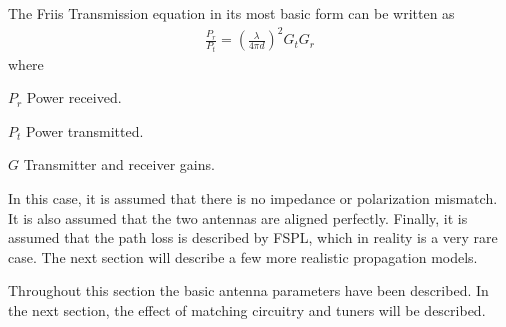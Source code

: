 The Friis Transmission equation in its most basic form can be written as \cite{balanis2012antenna} 
\begin{align}%
    \frac{P_r}{P_t} = \left( \frac{\lambda}{4 \pi d} \right)^2 G_{t} G_{r} 
\end{align}
where
\begin{where} 
\item[$P_r$] Power received.
\item[$P_t$] Power transmitted.
\item[$G$] Transmitter and receiver gains.
\end{where}
In this case, it is assumed that there is no impedance or polarization mismatch. It is also assumed that the two antennas are aligned perfectly. Finally, it is assumed that the path loss is described by FSPL, which in reality is a very rare case. The next section will describe a few more realistic propagation models.


\begin{aautail}
Throughout this section the basic antenna parameters have been described. In the next section, the effect of matching circuitry and tuners will be described.
\end{aautail}

